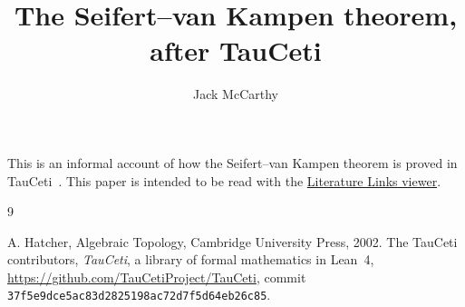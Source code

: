 \documentclass[11pt]{article}
\title{The Seifert--van Kampen theorem, after TauCeti}
\author{Jack McCarthy}
\date{}
\begin{document}
\maketitle

This is an informal account of how the Seifert--van Kampen theorem is proved
in TauCeti~\cite{library}.  This paper is intended to be read with the
\href{https://mathlib-initiative.github.io/seifert-van-kampen-tauceti/}{Literature Links viewer}.



\begin{thebibliography}{9}
\raggedright
{} A. Hatcher, Algebraic Topology, Cambridge University Press, 2002.
  The TauCeti contributors, \emph{TauCeti}, a library of
  formal mathematics in Lean~4, \url{https://github.com/TauCetiProject/TauCeti}, commit
  \texttt{37f5e9dce5ac83d2825198ac72d7f5d64eb26c85}.
\end{thebibliography}
\end{document}
